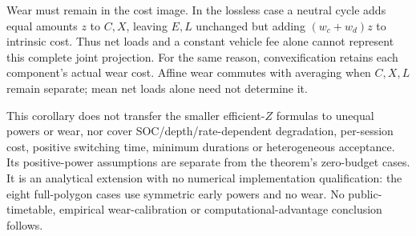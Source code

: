 Wear must remain in the cost image. In the lossless case a neutral cycle
adds equal amounts $z$ to $C,X$, leaving $E,L$ unchanged but adding
$(w_c+w_d)z$ to intrinsic cost. Thus net loads and a constant vehicle
fee alone cannot represent this complete joint projection. For the same
reason, convexification retains each component's actual wear cost. Affine
wear commutes with averaging when $C,X,L$ remain separate; mean net loads
alone need not determine it.

This corollary does not transfer the smaller efficient-$Z$ formulas to
unequal powers or wear, nor cover SOC/depth/rate-dependent degradation,
per-session cost, positive switching time, minimum durations or
heterogeneous acceptance. Its positive-power assumptions are separate
from the theorem's zero-budget cases. It is an analytical extension with
no numerical implementation qualification: the eight full-polygon cases
use symmetric early powers and no wear. No public-timetable, empirical
wear-calibration or computational-advantage conclusion follows.
